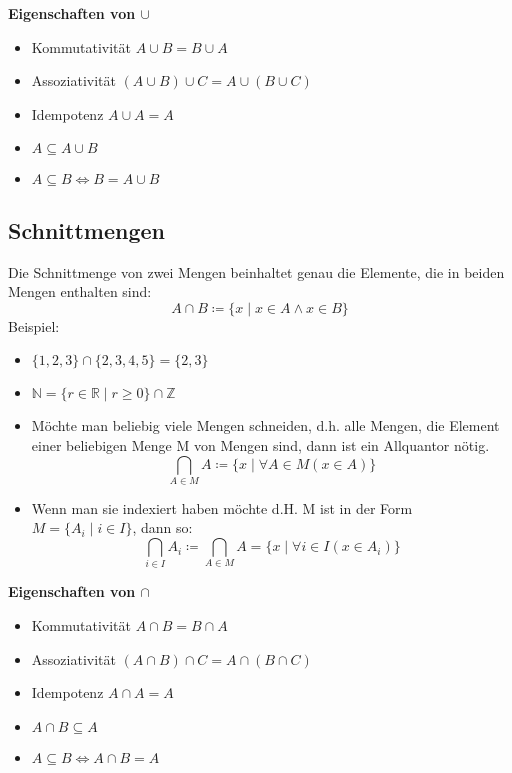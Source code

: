 {\bf Eigenschaften von $\cup$}
\begin{itemize}
    \item Kommutativität $A \cup B = B \cup A$
    \item Assoziativität $(A \cup B) \cup C = A \cup (B \cup C)$
    \item Idempotenz $A \cup A = A$
    \item $A \subseteq A \cup B$
    \item $A \subseteq B \Leftrightarrow B = A \cup B$
\end{itemize}

\subsection{Schnittmengen}
 Die Schnittmenge von zwei Mengen beinhaltet genau die Elemente, die in beiden Mengen enthalten sind:
    \begin{equation}
        A \cap B \coloneqq \{x \mid x \in A \wedge x \in B\}
    \end{equation}
Beispiel:
\begin{itemize}
    \item $\{1,2,3\} \cap \{2,3,4,5\} = \{2,3\}$
    \item $\mathbb{N} = \{r \in \mathbb{R} \mid r \geq 0\} \cap \mathbb{Z}$
\end{itemize}
\begin{itemize}
    \item Möchte man beliebig viele Mengen schneiden, d.h. alle
    Mengen, die Element einer beliebigen Menge M von Mengen
    sind, dann ist ein Allquantor nötig.
    \begin{equation}
        \bigcap_{A \in M} A \coloneqq \{x \mid \forall{A} \in M(x \in A)\}
    \end{equation}
    \item Wenn man sie indexiert haben möchte d.H. M ist in der Form $M = \{A_i \mid i \in I\}$, dann so:
    \begin{equation}
        \bigcap_{i \in I} A_i \coloneqq \bigcap_{A \in M}A = \{x \mid \forall{i} \in I(x \in A_i)\}
    \end{equation}
\end{itemize}
{\bf Eigenschaften von $\cap$}
\begin{itemize}
    \item Kommutativität $A \cap B = B \cap A$
    \item Assoziativität $(A \cap B) \cap C = A \cap (B \cap C)$
    \item Idempotenz $A \cap A = A$
    \item $A \cap B \subseteq A$
    \item $A \subseteq B \Leftrightarrow A \cap B = A $
\end{itemize}
